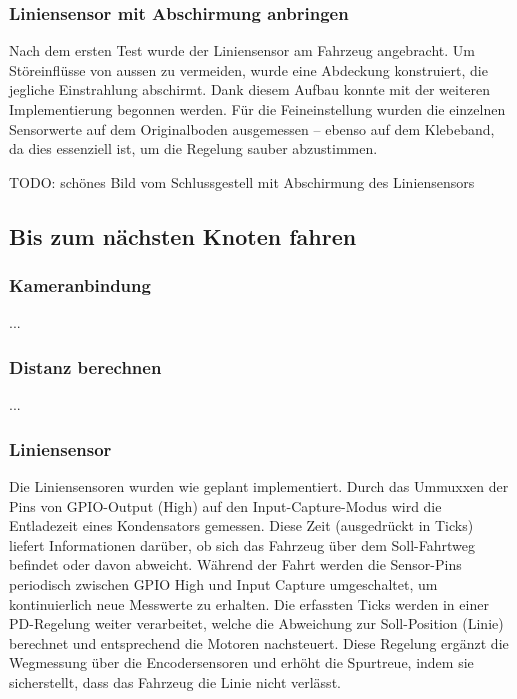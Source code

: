 \subsubsection{Liniensensor mit Abschirmung anbringen}

Nach dem ersten Test wurde der Liniensensor am Fahrzeug angebracht. Um Störeinflüsse von aussen zu vermeiden, wurde eine Abdeckung konstruiert, die jegliche Einstrahlung abschirmt. Dank diesem Aufbau konnte mit der weiteren Implementierung begonnen werden. Für die Feineinstellung wurden die einzelnen Sensorwerte auf dem Originalboden ausgemessen – ebenso auf dem Klebeband, da dies essenziell ist, um die Regelung sauber abzustimmen.



TODO: schönes Bild vom Schlussgestell mit Abschirmung des Liniensensors


\newpage

\subsection{Bis zum nächsten Knoten fahren}

\subsubsection{Kameranbindung}

...

\subsubsection{Distanz berechnen}

...

\subsubsection{Liniensensor}

Die Liniensensoren wurden wie geplant implementiert. Durch das Ummuxxen der Pins von GPIO-Output (High) auf den Input-Capture-Modus wird die Entladezeit eines Kondensators gemessen. Diese Zeit (ausgedrückt in Ticks) liefert Informationen darüber, ob sich das Fahrzeug über dem Soll-Fahrtweg befindet oder davon abweicht. Während der Fahrt werden die Sensor-Pins periodisch zwischen GPIO High und Input Capture umgeschaltet, um kontinuierlich neue Messwerte zu erhalten. Die erfassten Ticks werden in einer PD-Regelung weiter verarbeitet, welche die Abweichung zur Soll-Position (Linie) berechnet und entsprechend die Motoren nachsteuert. Diese Regelung ergänzt die Wegmessung über die Encodersensoren und erhöht die Spurtreue, indem sie sicherstellt, dass das Fahrzeug die Linie nicht verlässt.